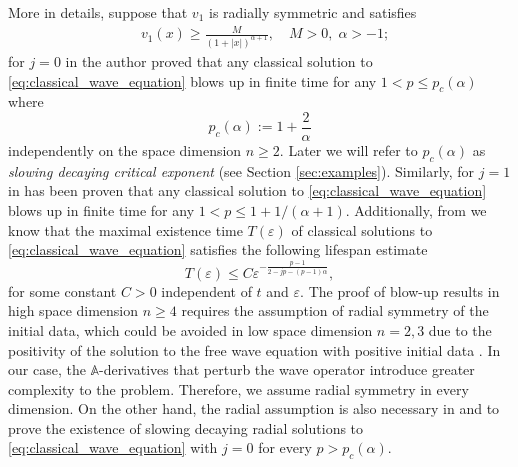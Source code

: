 \documentclass[11pt,reqno]{amsart}
\theoremstyle{definition}
\numberwithin{equation}{section}
\newcommand{\eps}{\varepsilon}
\newcommand{\A}{\mathbb{A}}
\begin{document}
More in details, suppose that $v_1$ is radially symmetric and satisfies 
%
\begin{align}
\label{eq:decay_data_intro}
&v_1(x)\geq \frac{M}{(1+|x|)^{\alpha+1}}, \quad  M>0, \; \alpha>-1;
\end{align}
%
for $j=0$ in \cite{takamura1995} the author proved that any classical solution to \eqref{eq:classical_wave_equation} blows up in finite time for any $1<p\leq p_c(\alpha)$ where 
\[p_c(\alpha):=1+\frac{2}{\alpha}\] 
independently on the space dimension $n\geq 2$. Later we will refer to $p_c(\alpha)$ as  \textit{slowing decaying critical exponent} (see Section \ref{sec:examples}). Similarly, for $j=1$ in \cite{takamura1995} has been proven that any classical solution to \eqref{eq:classical_wave_equation} blows up in finite time for any $1<p\leq 1+1/(\alpha+1)$. 
Additionally, from \cite{takamura1995} we know that the maximal existence time $T(\eps)$ of classical solutions to \eqref{eq:classical_wave_equation} satisfies the following lifespan estimate 
%
\begin{equation}
T(\eps)\leq C \eps^{-\frac{p-1}{2-jp-(p-1)\alpha}},
\end{equation}
for some constant $C>0$ independent of $t$ and $\eps$. 
The proof of blow-up results in high space dimension $n\geq 4$ requires the assumption of radial symmetry of the initial data, which could be avoided in low space dimension $n=2,3$ due to the positivity of the solution to the free wave equation with positive initial data \cite{A1986, AT1992}. In our case, the $\A$-derivatives that perturb the wave operator introduce greater complexity to the problem. Therefore, we assume radial symmetry in every dimension. On the other hand, the radial assumption is also necessary in \cite{K97} and \cite{K98} to prove the existence of slowing decaying radial solutions to \eqref{eq:classical_wave_equation} with $j=0$ for every $p>p_c(\alpha)$. \\
\end{document}

